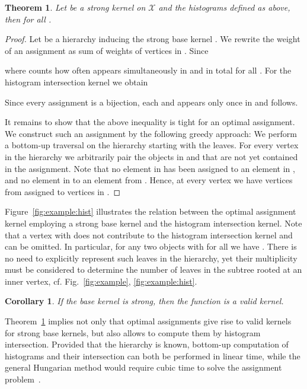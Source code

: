 \documentclass{article}
\newtheorem{corollary}{Corollary}
\newtheorem{theorem}{Theorem}
\newcommand{\X}{\ensuremath{\mathcal{X}}\xspace}
\begin{document}
\begin{theorem}\label{thm:strong_hist}
 Let  be a strong kernel on \X and the histograms  defined as 
 above, then  for all .
\end{theorem}
\begin{proof}
 Let  be a hierarchy inducing the strong base kernel .
 We rewrite the weight of an assignment  as sum of weights of vertices in .
 Since
 
 where  counts how often  appears simultaneously in  and 
 in total for all .
 For the histogram intersection kernel we obtain
 
 Since every assignment  is a bijection, each  and 
  appears only once in  and  follows. 

 It remains to show that the above inequality is tight for an optimal assignment.
 We construct such an assignment by the following greedy approach: We perform a bottom-up
 traversal on the hierarchy starting with the leaves. 
 For every vertex  in the hierarchy we arbitrarily pair the objects in  
 and  that are not yet contained in the assignment. Note that no element
 in  has been assigned to an element in , and no element 
 in  to an element from . Hence, at every vertex  we 
 have  vertices from  assigned to vertices in 
 . 
\end{proof}

Figure~\ref{fig:example:hist} illustrates the relation between the optimal 
assignment kernel employing a strong base kernel and the histogram intersection
kernel.
Note that a vertex  with  does not contribute to the
histogram intersection kernel and can be omitted. 
In particular, for any two objects  with  
for all  we have . There is no need
to explicitly represent such leaves in the hierarchy, yet their multiplicity must
be considered to determine the number of leaves in the subtree rooted at an
inner vertex, cf. Fig.~\ref{fig:example}, \ref{fig:example:hist}.


\begin{corollary}\label{cor:strong_valid}
 If the base kernel  is strong, then the function  is a valid kernel.
\end{corollary}

Theorem~\ref{thm:strong_hist} implies not only that optimal assignments give
rise to valid kernels for strong base kernels, but also allows to compute 
them by histogram intersection. Provided that the hierarchy is known, bottom-up 
computation of histograms and their intersection can both be performed in linear 
time, while the general Hungarian method would require cubic time to solve the 
assignment problem~\cite{Burkard2012}.
\end{document}
